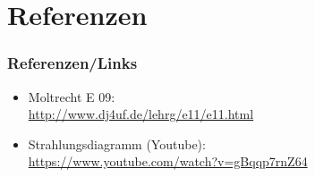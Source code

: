 \section*{Referenzen}

\begin{frame}
    \frametitle{Referenzen/Links}
    
    \footnotesize
    \begin{itemize}
        \item Moltrecht E 09: \\
              \url{http://www.dj4uf.de/lehrg/e11/e11.html}
        \item Strahlungsdiagramm (Youtube): \\
              \url{https://www.youtube.com/watch?v=gBqqp7rnZ64}
    \end{itemize}

\end{frame}


